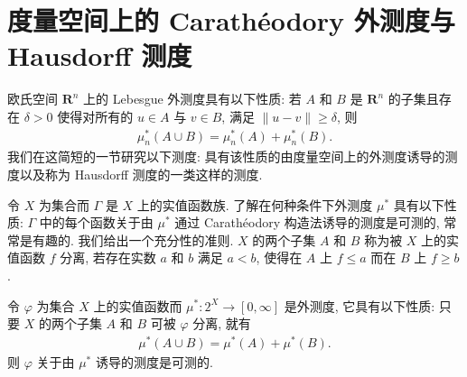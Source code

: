 \documentclass[../../main.tex]{subfiles}
\begin{document}
\section{度量空间上的 Carath\'eodory 外测度与 Hausdorff 测度}\label{section:ch20-hausdorff}

欧氏空间 $\mathbf{R}^{n}$ 上的 Lebesgue 外测度具有以下性质: 若 $A$ 和 $B$ 是 $\mathbf{R}^{n}$ 的子集且存在 $\delta>0$ 使得对所有的 $u\in A$ 与 $v\in B$, 满足 $\|u-v\|\geqslant\delta$, 则
\begin{align*}
\mu_{n}^{*}(A\cup B)=\mu_{n}^{*}(A)+\mu_{n}^{*}(B).
\end{align*}
我们在这简短的一节研究以下测度: 具有该性质的由度量空间上的外测度诱导的测度以及称为 Hausdorff 测度的一类这样的测度.

令 $X$ 为集合而 $\Gamma$ 是 $X$ 上的实值函数族. 了解在何种条件下外测度 $\mu^{*}$ 具有以下性质: $\Gamma$ 中的每个函数关于由 $\mu^{*}$ 通过 Carath\'eodory 构造法诱导的测度是可测的, 常常是有趣的. 我们给出一个充分性的准则. $X$ 的两个子集 $A$ 和 $B$ 称为被 $X$ 上的实值函数 $f$ 分离, 若存在实数 $a$ 和 $b$ 满足 $a<b$, 使得在 $A$ 上 $f\leqslant a$ 而在 $B$ 上 $f\geqslant b$.

\begin{proposition}\label{proposition:ch20-分离函数可测}
令 $\varphi$ 为集合 $X$ 上的实值函数而 $\mu^{*}:2^{X}\to[0,\infty]$ 是外测度, 它具有以下性质: 只要 $X$ 的两个子集 $A$ 和 $B$ 可被 $\varphi$ 分离, 就有
\begin{align*}
\mu^{*}(A\cup B)=\mu^{*}(A)+\mu^{*}(B).
\end{align*}
则 $\varphi$ 关于由 $\mu^{*}$ 诱导的测度是可测的.
\end{proposition}
\end{document}
